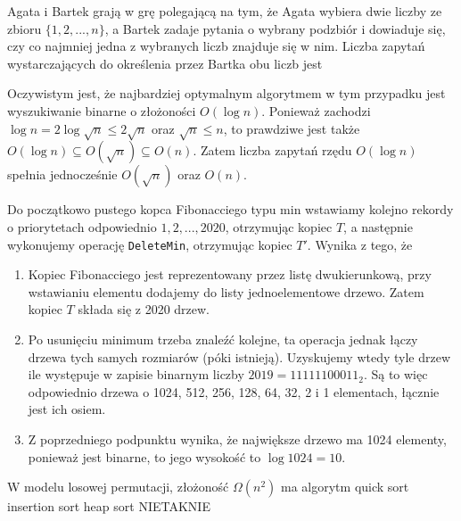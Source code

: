 \begin{solutions}
    \sol Agata i Bartek grają w grę polegającą na tym, że Agata wybiera dwie liczby ze zbioru $\{1, 2, ..., n\}$, a Bartek zadaje pytania o wybrany podzbiór i dowiaduje się, czy co najmniej jedna z wybranych liczb znajduje się w nim. Liczba zapytań wystarczających do określenia przez Bartka obu liczb jest

    Oczywistym jest, że najbardziej optymalnym algorytmem w tym przypadku jest wyszukiwanie binarne o złożoności $O(\log{n})$. Ponieważ zachodzi $\log{n} = 2 \log{\sqrt{n}} \le 2 \sqrt{n}$ oraz $\sqrt{n} \le n$, to prawdziwe jest także $O(\log{n}) \subseteq O(\sqrt{n}) \subseteq O(n)$. Zatem liczba zapytań rzędu $O(\log{n})$ spełnia jednocześnie $O(\sqrt{n})$ oraz $O(n)$.

    \sol Do początkowo pustego kopca Fibonacciego typu min wstawiamy kolejno rekordy o priorytetach odpowiednio $1, 2, ..., 2020$, otrzymując kopiec $T$, a następnie wykonujemy operację \texttt{DeleteMin}, otrzymując kopiec $T'$. Wynika z tego, że

    \begin{enumerate}[\bf A.]
        \item Kopiec Fibonacciego jest reprezentowany przez listę dwukierunkową, przy wstawianiu elementu dodajemy do listy jednoelementowe drzewo. Zatem kopiec $T$ składa się z 2020 drzew.

        \item Po usunięciu minimum trzeba znaleźć kolejne, ta operacja jednak łączy drzewa tych samych rozmiarów (póki istnieją). Uzyskujemy wtedy tyle drzew ile występuje w zapisie binarnym liczby $2019 = 11111100011_2$. Są to więc odpowiednio drzewa o 1024, 512, 256, 128, 64, 32, 2 i 1 elementach, łącznie jest ich osiem.

        \item Z poprzedniego podpunktu wynika, że największe drzewo ma 1024 elementy, ponieważ jest binarne, to jego wysokość to $\log 1024 = 10$.
    \end{enumerate}

    \sol W modelu losowej permutacji, złożoność $\Omega(n^2)$ ma algorytm
    \answerss
    {quick sort}
    {insertion sort}
    {heap sort}
    {NIE}{TAK}{NIE}
    

\end{solutions}

